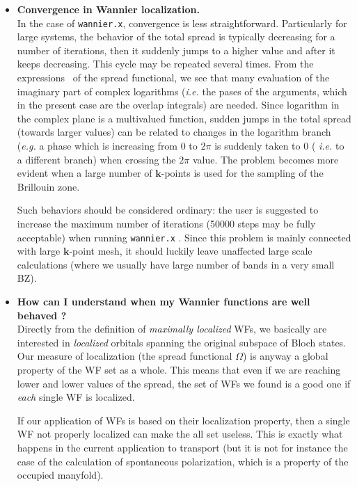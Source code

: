 \begin{itemize}
\item   {\bf Convergence in Wannier localization.} \\
        In the case of {\tt wannier.x}, convergence is less straightforward.
        Particularly for large systems, the behavior of the total spread
        is typically decreasing for a number of iterations, then it suddenly
        jumps to a higher value and after it keeps decreasing. This cycle may be
        repeated several times.
        From the expressions~\cite{nicola} of the spread functional, we see that
        many evaluation of the imaginary part of complex logarithms ({\it i.e.}
        the pases of the arguments, which in the present case are the overlap
        integrals) are needed. Since logarithm in the complex plane
        is a multivalued function, sudden jumps in the total spread (towards larger
        values) can be related to changes in the logarithm branch ({\it e.g.} a phase
        which is increasing from $0$ to $2\pi$ is suddenly taken to 0 (
        {\it i.e.} to a different branch) when crossing the $2\pi$ value.
        The problem becomes more evident when a large number of $\mathbf{k}$-points
        is used for the sampling of the Brillouin zone.

        Such behaviors should be considered ordinary: the user is suggested to increase
        the maximum number of iterations (50000 steps may be fully acceptable)
        when running {\tt wannier.x} . Since this problem is mainly connected with
        large $\mathbf{k}$-point mesh, it should luckily leave unaffected large scale
        calculations (where we usually have large number of bands in a very small BZ).

\item   {\bf How can I understand when my Wannier functions are well behaved ?} \\
        Directly from the definition of {\it maximally localized} WFs, we basically
        are interested in {\it localized} orbitals spanning the original subspace
        of Bloch states. Our measure of localization (the spread functional $\Omega$)
        is anyway a global property of the WF set as a whole.
        This means that even if we are reaching lower and lower
        values of the spread, the set of WFs we found is a good one if {\it each}
        single WF is localized.

        If our application of WFs is based on their localization property, then
        a single WF not properly localized can make the all set useless. This is
        exactly what happens in the current application to transport (but it is not
        for instance the case of the calculation of spontaneous polarization, which is
        a property of the occupied manyfold).


\end{itemize}
